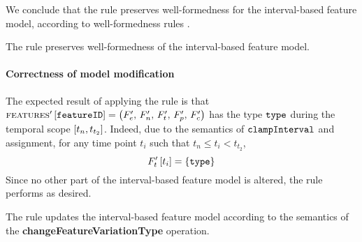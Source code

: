 We conclude that the  rule preserves well-formedness for the interval-based feature model, according to well-formedness rules . 
\\

\begin{lemma}
   The  rule preserves well-formedness of the interval-based feature model. 
   \label{lemma:change-feature-variation-type-well-formed}
\end{lemma}

\paragraph{Correctness of model modification}
The expected result of applying the rule is that $\textsc{features}' \left[ \texttt{featureID} \right] = \left(F'_e,\, F'_n,\, F'_t,\, F'_p,\, F'_c\right)$ has the type $\texttt{type}$ during the temporal scope $\interval{t_n}{t_{t_2}}$. Indeed, due to the semantics of $\texttt{clampInterval}$ and assignment, for any time point $t_i$ such that $t_n \leq t_i < t_{t_2}$,
\[
   F'_t \left[ t_i \right] = \left\{\texttt{type}\right\}
\]
Since no other part of the interval-based feature model is altered, the rule performs as desired.
\\

\begin{lemma}
   The  rule updates the interval-based feature model according to the semantics of the \textbf{changeFeatureVariationType} operation.
   \label{lemma:change-feature-variation-type-mod}
\end{lemma}
